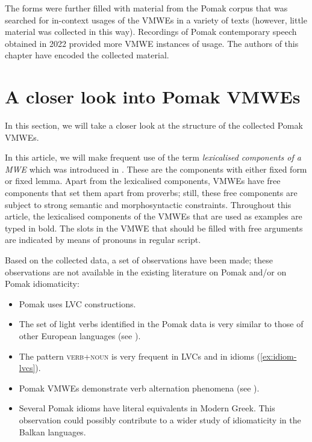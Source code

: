 \documentclass[output=paper,colorlinks,citecolor=brown]{langscibook}
\begin{document}
The forms were further filled with material from the Pomak corpus that was searched for in-context usages of the VMWEs in  a  variety of texts (however, little material was collected in this way).   Recordings of Pomak contemporary speech obtained in 2022 provided more VMWE instances of usage.
The authors of this chapter have encoded the collected material.

 
\section{A closer look into Pomak VMWEs}
\label{sec:lvcsgreek}

In this section, we will take a closer look at the structure of the collected Pomak VMWEs. 

In this article, we will make frequent use of the term \textit{lexicalised components of a MWE} which was introduced in \citet[94]{SavaryEtAl:18}. These are the components with either fixed form or fixed lemma. Apart from the lexicalised components, VMWEs have free components that set them apart from proverbs; still, these free components are subject to strong semantic and morphosyntactic constraints.   Throughout this article, the lexicalised components of the VMWEs that are used as examples are typed in bold. The slots in the VMWE that should be filled with free arguments are indicated by means of pronouns in regular script.

Based on the collected data, a set of observations have been made; these observations are not available in the existing literature on Pomak and/or on Pomak idiomaticity:
\begin{itemize}
    \item Pomak uses LVC constructions. 
    \item The set of light verbs identified in the Pomak data is very similar to those of other European languages (see ).
    \item The pattern \textsc{verb+noun} is very frequent in LVCs and in idioms (\ref{ex:idiom-lvcs}).
    \item Pomak VMWEs demonstrate verb alternation phenomena (see ).
    \item Several Pomak idioms have literal equivalents in Modern Greek. This observation could possibly contribute to a wider study of idiomaticity in the Balkan languages. 
\end{itemize}
\end{document}
